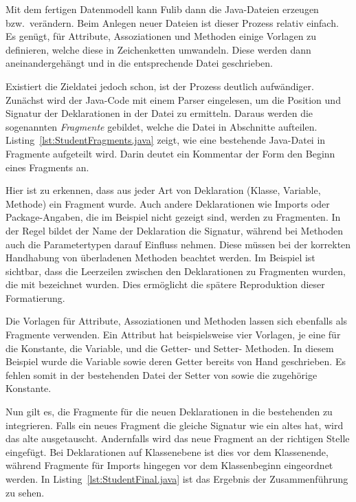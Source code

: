 Mit dem fertigen Datenmodell kann Fulib dann die Java-Dateien erzeugen bzw.\ verändern.
Beim Anlegen neuer Dateien ist dieser Prozess relativ einfach.
Es genügt, für Attribute, Assoziationen und Methoden einige Vorlagen zu definieren, welche diese in Zeichenketten umwandeln.
Diese werden dann aneinandergehängt und in die entsprechende Datei geschrieben.

Existiert die Zieldatei jedoch schon, ist der Prozess deutlich aufwändiger.
Zunächst wird der Java-Code mit einem Parser eingelesen, um die Position und Signatur der Deklarationen in der Datei zu ermitteln.
Daraus werden die sogenannten \emph{Fragmente} gebildet, welche die Datei in Abschnitte aufteilen.
Listing~\ref{lst:StudentFragments.java} zeigt, wie eine bestehende Java-Datei in Fragmente aufgeteilt wird.
Darin deutet ein Kommentar der Form  den Beginn eines Fragments an.


Hier ist zu erkennen, dass aus jeder Art von Deklaration (Klasse, Variable, Methode) ein Fragment wurde.
Auch andere Deklarationen wie Imports oder Package-Angaben, die im Beispiel nicht gezeigt sind, werden zu Fragmenten.
In der Regel bildet der Name der Deklaration die Signatur, während bei Methoden auch die Parametertypen darauf Einfluss nehmen.
Diese müssen bei der korrekten Handhabung von überladenen Methoden beachtet werden.
Im Beispiel ist sichtbar, dass die Leerzeilen zwischen den Deklarationen zu Fragmenten wurden, die mit  bezeichnet wurden.
Dies ermöglicht die spätere Reproduktion dieser Formatierung.

Die Vorlagen für Attribute, Assoziationen und Methoden lassen sich ebenfalls als Fragmente verwenden.
Ein Attribut hat beispielsweise vier Vorlagen, je eine für die Konstante, die Variable, und die Getter- und Setter- Methoden.
In diesem Beispiel wurde die Variable  sowie deren Getter bereits von Hand geschrieben.
Es fehlen somit in der bestehenden Datei der Setter von  sowie die zugehörige Konstante.

Nun gilt es, die Fragmente für die neuen Deklarationen in die bestehenden zu integrieren.
Falls ein neues Fragment die gleiche Signatur wie ein altes hat, wird das alte ausgetauscht.
Andernfalls wird das neue Fragment an der richtigen Stelle eingefügt.
Bei Deklarationen auf Klassenebene ist dies vor dem Klassenende, während Fragmente für Imports hingegen vor dem Klassenbeginn eingeordnet werden.
In Listing~\ref{lst:StudentFinal.java} ist das Ergebnis der Zusammenführung zu sehen.

